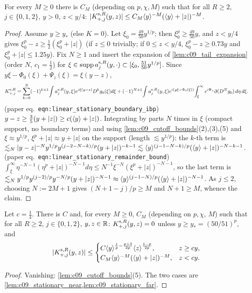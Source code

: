 \begin{lemma}
  \label{lem:c09_stationary_far}
  For every $M\ge0$ there is $C_M$ (depending on $p,\chi,M$) such that for all $R\ge2$, $j\in\{0,1,2\}$, $y>0$, $z<y/4$:
  $|K_{+,j}^{\textup{s},R}(y,z)|\le C_M\langle y \rangle^{-M}(\langle y \rangle+|z|)^{-M}$.
\end{lemma}
\begin{proof}
  Assume $y\ge y_*$ (else $K=0$). Let $\xi_0=\frac{49}{50}y^{1/p}$; then $\xi_0^p\ge\frac{49}{50}y$, and $z<y/4$ gives $\xi_0^p-z\ge\frac12(\xi_0^p+|z|)$ (if $z\le0$
  trivially; if $0\le z<y/4$, $\xi_0^p-z\ge0.73y$ and $\xi_0^p+|z|\le1.25y$). Fix $N\ge1$ and insert the expansion of \cref{lem:c09_tail_expansion}
  (order $N$, $c_1=\frac12$) for $\xi\in\operatorname{supp}a_j^{\textup{s},R}(y,\cdot)\subset[\xi_0,\frac{51}{50}y^{1/p}]$. Since $y\xi-\Phi_0(\xi)+\Psi_z(\xi)=\xi(y-z)$,
  \[
    K_{+,j}^{\textup{s},R}=\sum_{k=0}^N(-1)^{k+1}\!\int a_j^{\textup{s},R}(y,\xi)e^{i\xi(y-z)}D^kg_0(\xi)d\xi
    +(-1)^{N+1}\!\int a_j^{\textup{s},R}(y,\xi)e^{i(y\xi-\Phi_0(\xi))}\!\int_\xi^\infty e^{i\Psi_z}\partial(D^Ng_0)\,d\eta\,d\xi .
  \]
  (paper eq.~\texttt{eqn:linear\_stationary\_boundary\_ibp}) $y-z\ge\frac35(y+|z|)\ge c(\langle y \rangle+|z|)$. Integrating by parts $N$ times in $\xi$ (compact support, no boundary
  terms) and using \cref{lem:c09_cutoff_bounds}(2),(3),(5) and $\xi\approx y^{1/p}$, $\xi^p+|z|\approx y+|z|$ on the support (length $\lesssim y^{1/p}$):
  the $k$-th term is $\lesssim_N|y-z|^{-N}y^{1/p}y^{(j-2-N-k)/p}(y+|z|)^{-k-1}\lesssim\langle y \rangle^{(j-1-N-k)/p}(\langle y \rangle+|z|)^{-N-k-1}$.
  (paper eq.~\texttt{eqn:linear\_stationary\_remainder\_bound}) $\int_\xi^\infty\eta^{-N-1}(\eta^p+|z|)^{-N-1}d\eta\le N^{-1}\xi^{-N}(\xi^p+|z|)^{-N-1}$, so the last term is
  $\lesssim_N y^{1/p}y^{(j-2)/p}y^{-N/p}(y+|z|)^{-N-1}\approx\langle y \rangle^{(j-1-N)/p}(\langle y \rangle+|z|)^{-N-1}$.
  As $j\le2$, choosing $N:=2M+1$ gives $(N+1-j)/p\ge M$ and $N+1\ge M$, whence the claim.
\end{proof}

\begin{proposition}
  \label{prop:linear_stationary}
  Let $c=\frac14$. There is $C$ and, for every $M\ge0$, $C_M$ (depending on $p,\chi$, $M$) such that for all $R\ge2$, $j\in\{0,1,2\}$, $y,z\in\mathbb{R}$:
  $K_{+,j}^{\textup{s},R}(y,z)=0$ unless $y\ge y_*=(50/51)^p$, and
  \[
    |K_{+,j}^{\textup{s},R}(y,z)|\le\begin{cases}C\langle y \rangle^{\frac jp-\frac{p+3}{2p}}\langle z \rangle^{\frac{1-p}{2p}},&z\ge cy,\\ C_M\langle y \rangle^{-M}(\langle y \rangle+|z|)^{-M},&z<cy.\end{cases}
  \]
\end{proposition}
\begin{proof}
  Vanishing: \cref{lem:c09_cutoff_bounds}(5). The two cases are \cref{lem:c09_stationary_near,lem:c09_stationary_far}.
\end{proof}

